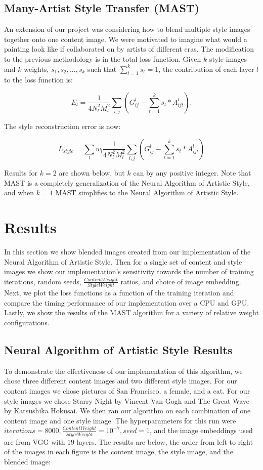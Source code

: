 \documentclass{article}
\begin{document}
\subsection{Many-Artist Style Transfer (MAST)}

An extension of our project was considering how to blend multiple style images together onto one content image. We were motivated to imagine what would a painting look like if collaborated on by artists of different eras. The modification to the previous methodology is in the total loss function. Given $k$ style images and $k$ weights, $s_{1}, s_{2}, ..., s_{k}$ such that $\sum_{t = 1}^{k} s_{t} = 1$, the contribution of each layer $l$ to the loss function is:

$$E_{l} = \frac{1}{4N_{l}^{2}M_{l}^{2}}\sum_{i, j}(G_{ij}^{l} - \sum_{t = 1}^{k} s_{t}*A_{ijt}^{l}).$$

\noindent The style reconstruction error is now:

$$L_{style} = \sum_{l} w_{l} \frac{1}{4N_{l}^{2}M_{l}^{2}} \sum_{i, j}(G_{ij}^{l} - \sum_{t = 1}^{k} s_{t}*A_{ijt}^{l})$$

\noindent Results for $k = 2$ are shown below, but $k$ can by any positive integer. Note that MAST is a completely generalization of the Neural Algorithm of Artistic Style, and when $k = 1$ MAST simplifies to the Neural Algorithm of Artistic Style.

\section{Results}

In this section we show blended images created from our implementation of the Neural Algorithm of Artistic Style. Then for a single set of content and style images we show our implementation's sensitivity towards the number of training iterations, random seeds, $\frac{Content Weight}{Style Weight}$ ratios, and choice of image embedding. Next, we plot the loss functions as a function of the training iteration and compare the timing performance of our implementation over a CPU and GPU. Lastly, we show the results of the MAST algorithm for a variety of relative weight configurations. 

\subsection{Neural Algorithm of Artistic Style Results}

To demonstrate the effectiveness of our implementation of this algorithm, we chose three different content images and two different style images. For our content images we chose pictures of San Francisco, a female, and a cat. For our style images we chose Starry Night by Vincent Van Gogh and The Great Wave by Katsushika Hokusai. We then ran our algorithm on each combination of one content image and one style image. The hyperparameters for this run were $iterations = 8000, \frac{Content Weight}{Style Weight} = 10^{-7}, seed = 1$, and the image embeddings used are from VGG with $19$ layers. The results are below, the order from left to right of the images in each figure is the content image, the style image, and the blended image:
\end{document}
